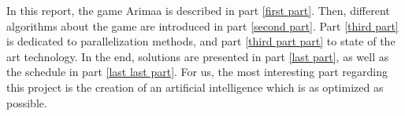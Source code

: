 In this report, the game Arimaa is described in part \ref{first part}. Then, different algorithms about the game are introduced in part \ref{second part}. Part \ref{third part} is dedicated to parallelization methods, and part \ref{third part part} to state of the art technology. In the end, solutions are presented in part \ref{last part}, as well as the schedule in part \ref{last last part}.
For us, the most interesting part regarding this project is the creation of an artificial intelligence which is as optimized as possible.